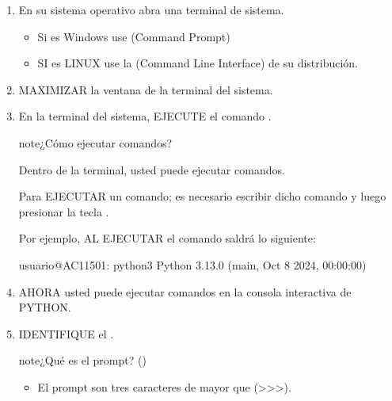 \documentclass[letterpaper,10pt,spanish]{sphinxmanual}
\begin{document}
\begin{enumerate}
%
\item {} 
\sphinxAtStartPar
En su sistema operativo abra una terminal de sistema.
\begin{itemize}
\item {} 
\sphinxAtStartPar
Si es Windows use  (Command Prompt)

\item {} 
\sphinxAtStartPar
SI es LINUX use la  (Command Line Interface) de su distribución.

\end{itemize}

\item {} 
\sphinxAtStartPar
MAXIMIZAR la ventana de la terminal del sistema.

\item {} 
\sphinxAtStartPar
En la terminal del sistema, EJECUTE el comando .

\begin{sphinxadmonition}{note}{¿Cómo ejecutar comandos?}

\sphinxAtStartPar
Dentro de la terminal, usted puede ejecutar comandos.

\sphinxAtStartPar
Para EJECUTAR un comando; es necesario escribir dicho comando y luego presionar la tecla .

\sphinxAtStartPar
Por ejemplo, AL EJECUTAR el comando  saldrá lo siguiente:

\begin{sphinxVerbatim}[commandchars=\\\{\}]
usuario@AC115\PYGZhy{}01:\PYGZti{}\PYGZdl{} python3
Python 3.13.0 (main, Oct 8 2024, 00:00:00) 
\end{sphinxVerbatim}
\end{sphinxadmonition}

\item {} 
\sphinxAtStartPar
AHORA usted puede ejecutar comandos en la consola interactiva de PYTHON.

\item {} 
\sphinxAtStartPar
IDENTIFIQUE el .

\begin{sphinxadmonition}{note}{¿Qué es el prompt? (\sphinxstylestrong{>>>})}
\begin{itemize}
\item {} 
\sphinxAtStartPar
El prompt son tres caracteres de mayor que (>>>).


\end{itemize}
\end{sphinxadmonition}
\end{enumerate}
\end{document}
